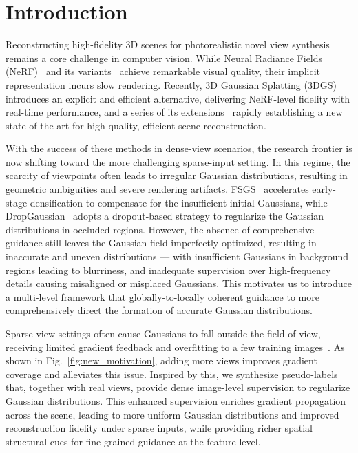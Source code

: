 \section{Introduction}
\label{sec:intro}

Reconstructing high-fidelity 3D scenes for photorealistic novel view synthesis remains a core challenge in computer vision. While Neural Radiance Fields (NeRF)~\cite{mildenhall2021nerf} and its variants~\cite{barron2021mipnerf,Barron_2022_CVPR,barron2023zipnerf} achieve remarkable visual quality, their implicit representation incurs slow rendering. Recently, 3D Gaussian Splatting (3DGS)~\cite{kerbl20233d} introduces an explicit and efficient alternative, delivering NeRF-level fidelity with real-time performance, and a series of its extensions~\cite{Yu2023MipSplatting,sabourgoli2024spotlesssplats,seo2025flod} rapidly establishing a new state-of-the-art for high-quality, efficient scene reconstruction.

With the success of these methods in dense-view scenarios, the research frontier is now shifting toward the more challenging sparse-input setting. In this regime, the scarcity of viewpoints often leads to irregular Gaussian distributions, resulting in geometric ambiguities and severe rendering artifacts. 
FSGS~\cite{zhu2024fsgs} accelerates early-stage densification to compensate for the insufficient initial Gaussians, while DropGaussian~\cite{Park_2025_CVPR} adopts a dropout-based strategy to regularize the Gaussian distributions in occluded regions. 
However, the absence of comprehensive guidance still leaves the Gaussian field imperfectly optimized, resulting in inaccurate and uneven distributions — with insufficient Gaussians in background regions leading to blurriness, and inadequate supervision over high-frequency details causing misaligned or misplaced Gaussians.
This motivates us to introduce a multi-level framework that globally-to-locally coherent guidance to more comprehensively direct the formation of accurate Gaussian distributions.

Sparse-view settings often cause Gaussians to fall outside the field of view, receiving limited gradient feedback and overfitting to a few training images~\cite{Park_2025_CVPR}.
As shown in Fig.~\ref{fig:new_motivation}, adding more views improves gradient coverage and alleviates this issue.
Inspired by this, we synthesize pseudo-labels that, together with real views, provide dense image-level supervision to regularize Gaussian distributions.
This enhanced supervision enriches gradient propagation across the scene, leading to more uniform Gaussian distributions and improved reconstruction fidelity under sparse inputs, while providing richer spatial structural cues for fine-grained guidance at the feature level.


